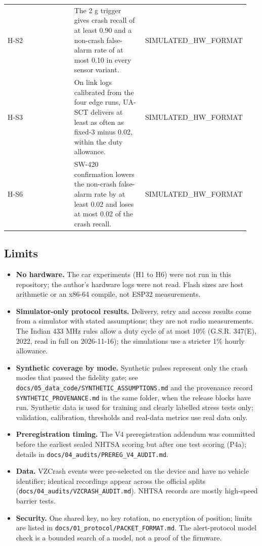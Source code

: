 {\begin{longtable}{p{0.317\linewidth}p{0.317\linewidth}p{0.317\linewidth}}
H-S2 & The 2 g trigger gives crash recall of at least 0.90 and a non-crash false-alarm rate of at most 0.10 in every sensor variant. & SIMULATED\_HW\_FORMAT \\
H-S3 & On link logs calibrated from the four edge runs, UA-SCT delivers at least as often as fixed-3 minus 0.02, within the duty allowance. & SIMULATED\_HW\_FORMAT \\
H-S6 & SW-420 confirmation lowers the non-crash false-alarm rate by at least 0.02 and loses at most 0.02 of the crash recall. & SIMULATED\_HW\_FORMAT \\
\bottomrule
\end{longtable}}

\subsection*{Limits}

\begin{itemize}
\item \textbf{No hardware.} The car experiments (H1 to H6) were not run in this repository; the author's hardware logs were not read. Flash sizes are host arithmetic or an x86-64 compile, not ESP32 measurements.
\item \textbf{Simulator-only protocol results.} Delivery, retry and access results come from a simulator with stated assumptions; they are not radio measurements. The Indian 433 MHz rules allow a duty cycle of at most 10\% (G.S.R. 347(E), 2022, read in full on 2026-11-16); the simulations use a stricter 1\% hourly allowance.
\item \textbf{Synthetic coverage by mode.} Synthetic pulses represent only the crash modes that passed the fidelity gate; see \texttt{docs/05\_data\_code/SYNTHETIC\_ASSUMPTIONS.md} and the provenance record \texttt{SYNTHETIC\_PROVENANCE.md} in the same folder, when the release blocks have run. Synthetic data is used for training and clearly labelled stress tests only; validation, calibration, thresholds and real-data metrics use real data only.
\item \textbf{Preregistration timing.} The V4 preregistration addendum was committed before the earliest sealed NHTSA scoring but after one test scoring (P4a); details in \texttt{docs/04\_audits/PREREG\_V4\_AUDIT.md}.
\item \textbf{Data.} VZCrash events were pre-selected on the device and have no vehicle identifier; identical recordings appear across the official splits (\texttt{docs/04\_audits/VZCRASH\_AUDIT.md}). NHTSA records are mostly high-speed barrier tests.
\item \textbf{Security.} One shared key, no key rotation, no encryption of position; limits are listed in \texttt{docs/01\_protocol/PACKET\_FORMAT.md}. The alert-protocol model check is a bounded search of a model, not a proof of the firmware.
\end{itemize}

